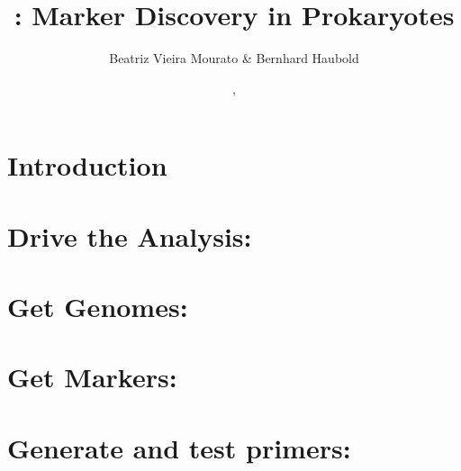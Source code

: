 \documentclass[a4paper]{report}
\begin{document}
\pagestyle{noweb}

\title{: Marker Discovery in Prokaryotes}
\author{Beatriz Vieira Mourato \& Bernhard Haubold}
\date{\!\!, }
\maketitle

\tableofcontents

\chapter{Introduction}

\chapter{Drive the Analysis: }

\chapter{Get Genomes: }

\chapter{Get Markers: }

\chapter{Generate and test primers: }



\end{document}
